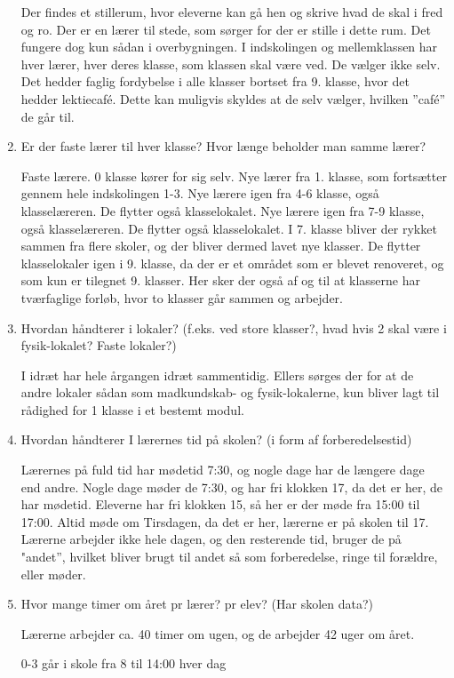 \begin{enumerate}
	Der findes et stillerum, hvor eleverne kan gå hen og skrive hvad de skal i fred og ro. Der er en lærer til stede, som sørger for der er stille i dette rum.
	Det fungere dog kun sådan i overbygningen. I indskolingen og mellemklassen har hver lærer, hver deres klasse, som klassen skal være ved. De vælger ikke selv.
	Det hedder faglig fordybelse i alle klasser bortset fra 9. klasse, hvor det hedder lektiecafé. Dette kan muligvis skyldes at de selv vælger, hvilken ''café'' de går til.
	\item Er der faste lærer til hver klasse? Hvor længe beholder man samme lærer?
	
	Faste lærere.
	0 klasse kører for sig selv.
	Nye lærer fra 1. klasse, som fortsætter gennem hele indskolingen 1-3.
	Nye lærere igen fra 4-6 klasse, også klasselæreren. De flytter også klasselokalet.
	Nye lærere igen fra 7-9 klasse, også klasselæreren. De flytter også klasselokalet. I 7. klasse bliver der rykket sammen fra flere skoler, og der bliver dermed lavet nye klasser. De flytter klasselokaler igen i 9. klasse, da der er et området som er blevet renoveret, og som kun er tilegnet 9. klasser. Her sker der også af og til at klasserne har tværfaglige forløb, hvor to klasser går sammen og arbejder.
	\item Hvordan håndterer i lokaler? (f.eks. ved store klasser?, hvad hvis 2 skal være i fysik-lokalet? Faste lokaler?)
	
	I idræt har hele årgangen idræt sammentidig. Ellers sørges der for at de andre lokaler sådan som madkundskab- og fysik-lokalerne, kun bliver lagt til rådighed for 1 klasse i et bestemt modul.
	\item Hvordan håndterer I lærernes tid på skolen? (i form af forberedelsestid)
	
	Lærernes på fuld tid har mødetid 7:30, og nogle dage har de længere dage end andre. Nogle dage møder de 7:30, og har fri klokken 17, da det er her, de har mødetid. Eleverne har fri klokken 15, så her er der møde fra 15:00 til 17:00. Altid møde om Tirsdagen, da det er her, lærerne er på skolen til 17. Lærerne arbejder ikke hele dagen, og den resterende tid, bruger de på "andet'', hvilket bliver brugt til andet så som forberedelse, ringe til forældre, eller møder.
	\item Hvor mange timer om året pr lærer? pr elev? (Har skolen data?)
	
	Lærerne arbejder ca. 40 timer om ugen, og de arbejder 42 uger om året.
	
	0-3 går i skole fra 8 til 14:00 hver dag
	

\end{enumerate}
